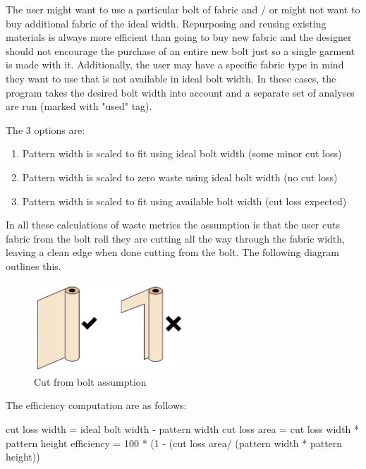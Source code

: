 The user might want to use a particular bolt of fabric and / or might not want to buy additional fabric of the ideal width. Repurposing and reusing existing materials is always more efficient than going to buy new fabric and the designer should not encourage the purchase of an entire new bolt just so a single garment is made with it. Additionally, the user may have a specific fabric type in mind they want to use that is not available in ideal bolt width. In these cases, the program takes the desired bolt width into account and a separate set of analyses are run (marked with "used" tag).

The 3 options are:
\begin{enumerate}
    \item Pattern width is scaled to fit using ideal bolt width (some minor cut loss)
    \item Pattern width is scaled to zero waste using ideal bolt width (no cut loss)
    \item Pattern width is scaled to fit using available bolt width (cut loss expected)
\end{enumerate}

In all these calculations of waste metrics the assumption is that the user cuts fabric from the bolt roll they are cutting all the way through the fabric width, leaving a clean edge when done cutting from the bolt. The following diagram outlines this.

\begin{figure} [H]
    \centering
    \includegraphics[width = 0.5\textwidth]{Images/bolt cut.png}
    \caption{Cut from bolt assumption}
    \label{fig:cut from bolt}
\end{figure}

The efficiency computation are as follows:

cut loss width = ideal bolt width - pattern width \newline
cut loss area = cut loss width * pattern height \newline
efficiency = 100 * (1 - (cut loss area/ (pattern width * pattern height))


